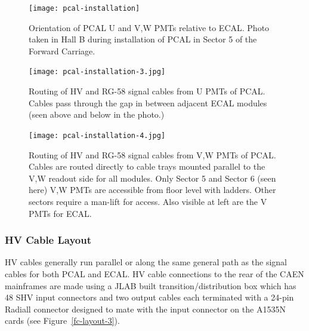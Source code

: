 \documentclass[letterpaper,10pt]{article}
\begin{document}
\begin{figure}[htbp]
  \centering
  \texttt{[image: pcal-installation]}
  \vspace{2mm}
  \caption{Orientation of PCAL U and V,W PMTs relative to ECAL.  Photo taken in Hall B during installation
  of PCAL in Sector 5 of the Forward Carriage.}
\label{pcal-pmts-2}
\end{figure}

\begin{figure}[htbp]
  \centering
  \texttt{[image: pcal-installation-3.jpg]}
  \vspace{2mm}
  \caption{Routing of HV and RG-58 signal cables from U PMTs of PCAL.  Cables pass through the
  gap in between adjacent ECAL modules (seen above and below in the photo.)}
\label{pcal-pmts-3}
\end{figure}

\begin{figure}[htbp]
  \centering
  \texttt{[image: pcal-installation-4.jpg]}
  \vspace{2mm}
  \caption{Routing of HV and RG-58 signal cables from V,W PMTs of PCAL.  Cables are routed directly to
    cable trays mounted parallel to the V,W readout side for all modules. Only Sector 5 and Sector 6
    (seen here) V,W PMTs are accessible from floor level with ladders.  Other sectors require a man-lift for access.
     Also visible at left are the V PMTs for ECAL.}
\label{pcal-pmts-4}
\end{figure}


\subsubsection{HV Cable Layout}
\label{hv-layout}

HV cables generally run parallel or along the same general path as the signal cables for both PCAL and ECAL.
HV cable connections to the rear of the CAEN mainframes are made using a JLAB built transition/distribution
box which has 48 SHV input connectors and two output cables each terminated with a 24-pin Radiall connector
designed to mate with the input connector on the A1535N cards (see Figure~\ref{fc-layout-3}).
\end{document}
